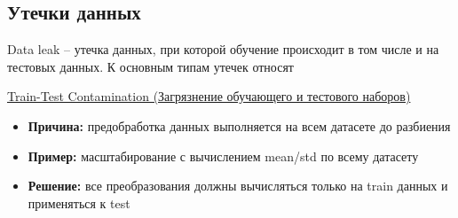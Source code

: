 %
%

\subsection{Утечки данных}

Data leak -- утечка данных, при которой обучение происходит в том числе и на тестовых данных.
К основным типам утечек относят

%

\underline{Train-Test Contamination (Загрязнение обучающего и тестового наборов)}

\begin{itemize}
    \item \textbf{Причина:} предобработка данных выполняется на всем датасете до разбиения
    \item \textbf{Пример:} масштабирование с вычислением mean/std по всему датасету
    \item \textbf{Решение:} все преобразования должны вычисляться только на train данных и применяться к test
\end{itemize}


